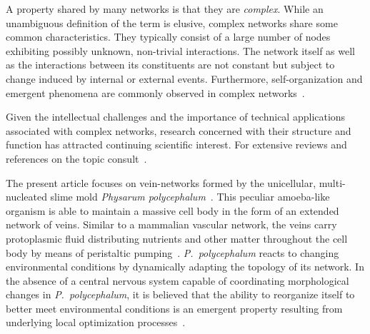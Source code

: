 	A property shared by many networks is that they are \emph{complex}. While an unambiguous definition of the term is elusive, complex networks share some common characteristics. They typically consist of a large number of nodes exhibiting possibly unknown, non-trivial interactions. The network itself as well as the interactions between its constituents are not constant but subject to change induced by internal or external events. Furthermore, self-organization and emergent phenomena are commonly observed in complex networks~\cite{barabasi1999emergence,boccaletti2006complex}.

	Given the intellectual challenges and the importance of technical applications associated with complex networks, research concerned with their structure and function has attracted continuing scientific interest. For extensive reviews and references on the topic consult~\cite{newman2003structure,boccaletti2006complex,strogatz2001exploring,amaral2004complex}.

	The present article focuses on vein-networks formed by the unicellular, multi-nucleated slime mold \emph{Physarum polycephalum}~\cite{lifecycle}. This peculiar amoeba-like organism is able to maintain a massive cell body in the form of an extended network of veins. Similar to a mammalian vascular network, the veins carry protoplasmic fluid distributing nutrients and other matter throughout the cell body by means of peristaltic pumping~\cite{kamiya1959motive}. \emph{P.~polycephalum} reacts to changing environmental conditions by dynamically adapting the topology of its network. In the absence of a central nervous system capable of coordinating morphological changes in \emph{P.~polycephalum}, it is believed that the ability to reorganize itself to better meet environmental conditions is an emergent property resulting from underlying local optimization processes~\cite{tero2010rules,nakagaki2007minimum}.

